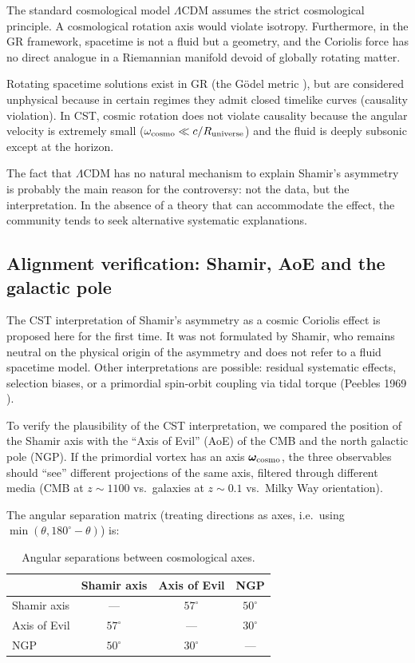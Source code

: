 \documentclass[10pt,a4paper]{article}
\begin{document}
The standard cosmological model $\Lambda$CDM assumes the strict cosmological principle. A cosmological rotation axis would violate isotropy. Furthermore, in the GR framework, spacetime is not a fluid but a geometry, and the Coriolis force has no direct analogue in a Riemannian manifold devoid of globally rotating matter.

Rotating spacetime solutions exist in GR (the G\"odel metric \cite{Godel1949}), but are considered unphysical because in certain regimes they admit closed timelike curves (causality violation). In CST, cosmic rotation does not violate causality because the angular velocity is extremely small ($\omega_{\rm cosmo} \ll c/R_{\rm universe}$) and the fluid is deeply subsonic except at the horizon.

The fact that $\Lambda$CDM has no natural mechanism to explain Shamir's asymmetry is probably the main reason for the controversy: not the data, but the interpretation. In the absence of a theory that can accommodate the effect, the community tends to seek alternative systematic explanations.

\subsection{Alignment verification: Shamir, AoE and the galactic pole}\label{sec:B1}

The CST interpretation of Shamir's asymmetry as a cosmic Coriolis effect is proposed here for the first time. It was not formulated by Shamir, who remains neutral on the physical origin of the asymmetry and does not refer to a fluid spacetime model. Other interpretations are possible: residual systematic effects, selection biases, or a primordial spin-orbit coupling via tidal torque (Peebles 1969 \cite{Peebles1969}).

To verify the plausibility of the CST interpretation, we compared the position of the Shamir axis with the ``Axis of Evil'' (AoE) of the CMB and the north galactic pole (NGP). If the primordial vortex has an axis $\boldsymbol{\omega}_{\rm cosmo}$, the three observables should ``see'' different projections of the same axis, filtered through different media (CMB at $z \sim 1100$ vs.\ galaxies at $z \sim 0.1$ vs.\ Milky Way orientation).

The angular separation matrix (treating directions as axes, i.e.\ using $\min(\theta, 180^\circ - \theta)$) is:

\begin{table}[h]
\centering
\caption{Angular separations between cosmological axes.}\label{tab:axes}
\begin{tabular}{lccc}
\toprule
 & Shamir axis & Axis of Evil & NGP \\
\midrule
Shamir axis & --- & $57^\circ$ & $50^\circ$ \\
Axis of Evil & $57^\circ$ & --- & $30^\circ$ \\
NGP & $50^\circ$ & $30^\circ$ & --- \\
\bottomrule
\end{tabular}
\end{table}
\end{document}
